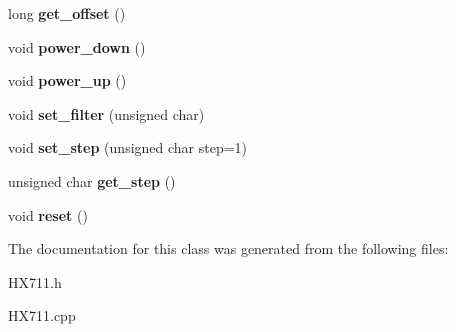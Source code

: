 \begin{DoxyCompactItemize}
\item 
\hypertarget{class_h_x711_a96f14aeeed56b93aebe973a4e601f027}{long {\bfseries get\-\_\-offset} ()}\label{class_h_x711_a96f14aeeed56b93aebe973a4e601f027}

\item 
\hypertarget{class_h_x711_ad41a2054279164a0322ac4e1a17fef9b}{void {\bfseries power\-\_\-down} ()}\label{class_h_x711_ad41a2054279164a0322ac4e1a17fef9b}

\item 
\hypertarget{class_h_x711_a6fdabd2ecaa3a461d52731f7cbc0d1c0}{void {\bfseries power\-\_\-up} ()}\label{class_h_x711_a6fdabd2ecaa3a461d52731f7cbc0d1c0}

\item 
\hypertarget{class_h_x711_a163622f59e66e44b93213cae723288b7}{void {\bfseries set\-\_\-filter} (unsigned char)}\label{class_h_x711_a163622f59e66e44b93213cae723288b7}

\item 
\hypertarget{class_h_x711_afd584391740f0a84ed21e083eb0cfbae}{void {\bfseries set\-\_\-step} (unsigned char step=1)}\label{class_h_x711_afd584391740f0a84ed21e083eb0cfbae}

\item 
\hypertarget{class_h_x711_a7f1a78d662bf14b0e4d6611683cda7be}{unsigned char {\bfseries get\-\_\-step} ()}\label{class_h_x711_a7f1a78d662bf14b0e4d6611683cda7be}

\item 
\hypertarget{class_h_x711_a2b37ffb34110e372e498d42bb0cc0c13}{void {\bfseries reset} ()}\label{class_h_x711_a2b37ffb34110e372e498d42bb0cc0c13}

\end{DoxyCompactItemize}


The documentation for this class was generated from the following files\-:\begin{DoxyCompactItemize}
\item 
H\-X711.\-h\item 
H\-X711.\-cpp\end{DoxyCompactItemize}
